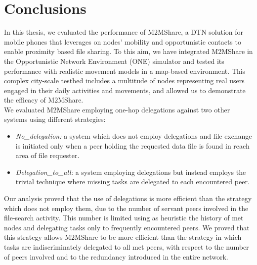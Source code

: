 
\chapter{Conclusions}\label{conclusioni} %




In this thesis, we evaluated the performance of M2MShare, a DTN solution for mobile phones that leverages on nodes' mobility and opportunistic contacts to enable proximity based file sharing. To this aim, we have integrated M2MShare in the Opportunistic Network Environment (ONE) simulator and tested its performance with realistic movement models in a map-based environment. This complex city-scale testbed includes a multitude of nodes representing real users engaged in their daily activities and movements, and allowed us to demonstrate the efficacy of M2MShare. 
\\

We evaluated M2MShare employing one-hop delegations against two other systems using different strategies:
\begin{itemize}
\item \textit{No\_delegation:} a system which does not employ delegations and file exchange is initiated only when a peer holding the requested data file is found in reach area of file requester.
\item \textit{Delegation\_to\_all:} a system employing delegations but instead employs the trivial technique where missing tasks are delegated to each encountered peer.
\end{itemize}
Our analysis proved that the use of delegations is more efficient than the strategy which does not employ them, due to the number of servant peers involved in the file-search activity. This number is limited using as heuristic the history of met nodes and delegating tasks only to frequently encountered peers. We proved that this strategy allows M2MShare to be more efficient than the strategy in which tasks are indiscriminately delegated to all met peers, with respect to the number of peers involved and to the redundancy introduced in the entire network.
\\

